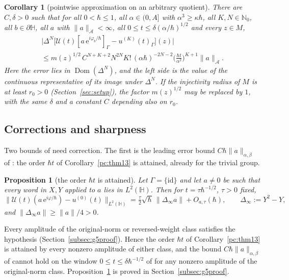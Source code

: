 \documentclass[twoside,10pt]{article}
\numberwithin{equation}{section}
\theoremstyle{slbody}
\newtheorem{proposition}[equation]{Proposition}
\newtheorem{corollary}[equation]{Corollary}
\theoremstyle{remark}
\newcommand{\Hb}{\mathbb{H}}
\newcommand{\norm}[1]{\lVert #1\rVert}
\newcommand{\ue}{\mathrm{e}}
\newcommand{\cU}{\mathcal{U}}
\begin{document}
\begin{corollary}[pointwise approximation on an arbitrary quotient]\label{pc:cor16}\label{pc:cor16bg}\label{cor:dd16}
There are $C,\delta>0$ such that for all $0<\hbar\le1$, all $\alpha\in(0,A]$ with $\alpha^3\ge\kappa\hbar$, all $K,N\in\mathbb N_0$, all
$b\in\partial\Hb$, all $a$ with $\norm a_{\mathcal A}<\infty$, all $0\le t\le\delta(\alpha/\hbar)^{1/2}$ and every $z\in M$,
\begin{multline*}
  \big|\Delta^N\big[\cU(t)[a\,\ue^{i\varphi_b/\hbar}]_\Gamma-u^{(K)}(t)_\Gamma\big](z)\big|\\
  \le m(z)^{1/2}\,C^{N+K+2}N^{2N}K!\,(\alpha\hbar)^{-2N-2}\Big(\frac{\hbar t}{\alpha^2}\Big)^{K+1}\norm a_{\mathcal A}.
\end{multline*}
Here the error lies in $\operatorname{Dom}(\Delta^N)$, and the left side is the value of the continuous representative of its
image under $\Delta^N$.
If the injectivity radius of $M$ is at least $r_0>0$ (Section~\ref{sec:setup}), the factor $m(z)^{1/2}$ may be replaced by
$1$, with the same $\delta$ and a constant $C$ depending also on $r_0$.
\end{corollary}

\subsection{Corrections and sharpness}\label{subsec:corrections}
Two bounds of \cite{S} need correction. The first is the leading error bound $C\hbar\norm a_{\alpha,\beta}$ of
\cite[(1.18)]{S}: the order $\hbar t$ of Corollary~\ref{pc:thm13} is attained, already for the trivial group.

\begin{proposition}[the order $\hbar t$ is attained]\label{prop:g5}
Let $\Gamma=\{\mathrm{id}\}$ and let $a\ne0$ be such that every word in $X,Y$ applied to $a$ lies in $L^2(\Hb)$.
Then for $t=\tau\hbar^{-1/2}$, $\tau>0$ fixed,
\[
\norm{\cU(t)(a\,\ue^{i\varphi/\hbar})-u^{(0)}(t)}_{L^2(\Hb)}=\tfrac\tau2\sqrt\hbar\,\norm{\Delta_\infty a}+O_{a,\tau}(\hbar),\qquad \Delta_\infty:=Y^2-Y,
\]
and $\norm{\Delta_\infty a}\ge\norm a/4>0$.
\end{proposition}

Every amplitude of the original-norm or reversed-weight class satisfies the hypothesis (Section~\ref{subsec:g5proof}).
Hence the order $\hbar t$ of Corollary~\ref{pc:thm13} is attained by every nonzero amplitude of either class, and the bound
$C\hbar\norm a_{\alpha,\beta}$ of \cite[(1.18)]{S} cannot hold on the window $0\le t\le\delta\hbar^{-1/2}$ of \cite[(1.19)]{S}
for any nonzero amplitude of the original-norm class. Proposition~\ref{prop:g5} is proved in Section~\ref{subsec:g5proof}.
\end{document}
